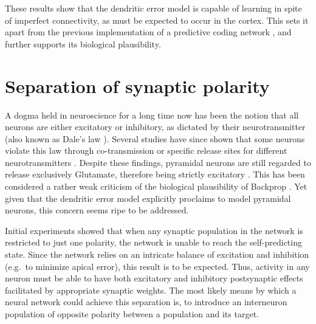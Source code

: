 These results show that the dendritic error model is capable of learning in spite of imperfect connectivity, as must be
expected to occur in the cortex. This sets it apart from the previous implementation of a predictive coding network
\citep{Whittington2017}, and further supports its biological plausibility.



\section{Separation of synaptic polarity}\label{sec-dales-law}


A dogma held in neuroscience for a long time now has been the notion that all neurons are either excitatory or
inhibitory, as dictated by their neurotransmitter (also known as Dale's law \citep{Kandel1968}). Several studies have
since shown that some neurons violate this law through co-transmission or specific release sites for different
neurotransmitters \citep{Svensson2019,Barranca2022}. Despite these findings, pyramidal neurons are still regarded to
release exclusively Glutamate, therefore being strictly excitatory
\citep{gerfen2018long,spruston2008pyramidal,Eyal2018}. This has been considered a rather weak criticism of the
biological plausibility of Backprop \citep{Bartunov2018}. Yet given that the dendritic error model explicitly proclaims
to model pyramidal neurons, this concern seems ripe to be addressed.

Initial experiments showed that when any synaptic population in the network is restricted to just one polarity, the
network is unable to reach the self-predicting state. Since the network relies on an intricate balance of excitation and
inhibition (e.g.\ to minimize apical error), this result is to be expected. Thus, activity in any neuron must be able to
have both excitatory and inhibitory postsynaptic effects facilitated by appropriate synaptic weights. The most likely
means by which a neural network could achieve this separation is, to introduce an interneuron population of opposite
polarity between a population and its target.


